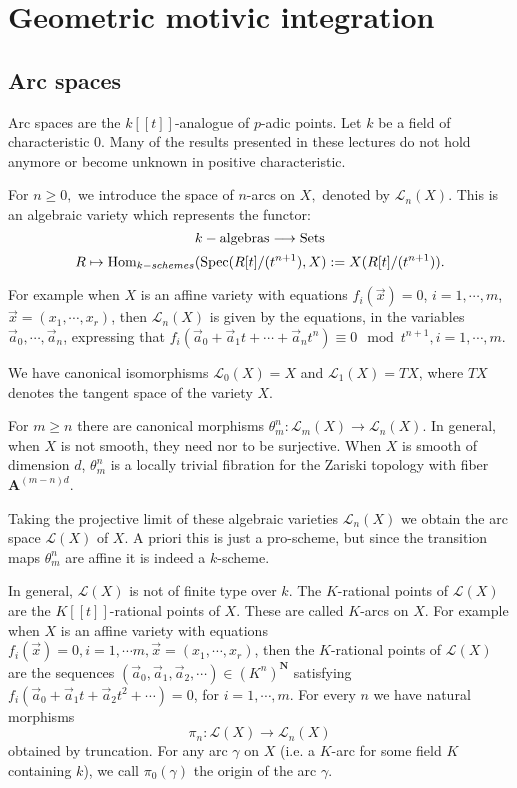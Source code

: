 \documentclass[english,12pt]{amsart}
\def\Spec{{\rm Spec}}
\let\cal\mathcal
\def\AA{{\mathbf A}}
\def\NN{{\mathbf N}}
\def\cL{{\mathcal L}}
\theoremstyle{definition}
\theoremstyle{remark}
\theoremstyle{plain}
\numberwithin{equation}{subsection}
\let\cal\mathcal
\def\AA{{\mathbf A}}
\def\NN{{\mathbf N}}
\def\cL{{\mathcal L}}
\begin{document}
\section{Geometric motivic integration}




\subsection{ Arc spaces}Arc spaces are the $k [[t]]$-analogue of
$p$-adic points.
Let $k$ be a field of characteristic $0$. 
Many of the results presented in these lectures do not hold
anymore or become unknown
in positive characteristic.

For $n \geq 0,$ we introduce the space of $n$-arcs on $X,$ denoted by $\cL_n(X)$.
This is an algebraic variety which represents the functor:
$$  k-{\rm algebras} \longrightarrow \text{Sets}$$
$$ R \mapsto 
\text{Hom}_{k-schemes}(\Spec(R[t]/(t^{n+1}),X):=X(R[t]/(t^{n+1})). $$






For example when $X$ is an affine variety with equations $f_i (\vec x) = 0$,
$i= 1, \cdots, m$, $\vec x = (x_1,\cdots, x_r)$, then ${\cal L}_n(X)$
is given by the equations, in the variables $\vec a_0, \cdots, \vec a_n$,
expressing that $f_i (\vec a_0 + \vec a_1t + \cdots + \vec a_n t^n) \equiv 0
\mod t^{n+1}, i = 1,\cdots, m$.  



We have canonical
isomorphisms
$\cL_0(X)=X$ and $\cL_1(X)=TX$,
where $TX$ denotes the tangent space of the variety  $X$.





For $m \geq n$ there are canonical morphisms
$\theta_m^n : \cL_m(X) \rightarrow \cL_n(X)$. In general, when $X$ is not smooth,
they need nor to be surjective. When $X$ is smooth of dimension $d$,
$\theta_m^n$ is a locally trivial fibration for the Zariski topology with fiber
$\AA^{(m - n)d}$.



Taking the projective limit of these algebraic varieties ${\cal L}_n(X)$ we
obtain
the arc space ${\cal L}(X)$ of $X$. A priori this is just a pro-scheme,
but since the transition maps
$\theta_m^n$ are affine it is indeed a $k$-scheme.





In general, ${\cal L}(X)$ is not of finite type over $k$.
The $K$-rational points of ${\cal L} (X)$ are
the
$K[[t]]$-rational points of $X$.  These are called $K$-arcs on $X$.  For
example when $X$ is an affine variety with equations $f_i(\vec x) = 0,
i = 1, \cdots m, \vec x = (x_1,\cdots,x_r)$, then the $K$-rational points
of
${\cal L}(X)$ are the sequences $(\vec a_0, \vec a_1, \vec a_2, \cdots) \in
(K^n)^{\NN}$ satisfying $f_i (\vec a_0 + \vec a_1 t + \vec a_2t^2 +
\cdots )  = 0$,  for $i = 1,\cdots,m$. 
For every $n$ we have natural morphisms
$$\pi_n : {\cal L}(X) \rightarrow {\cal L}_n(X)$$
obtained by truncation.  For any arc $\gamma$ on $X$ (i.e. a $K$-arc for
some field $K$ containing $k$), we call $\pi_0(\gamma)$ the origin of the
arc
$\gamma$.
\end{document}
